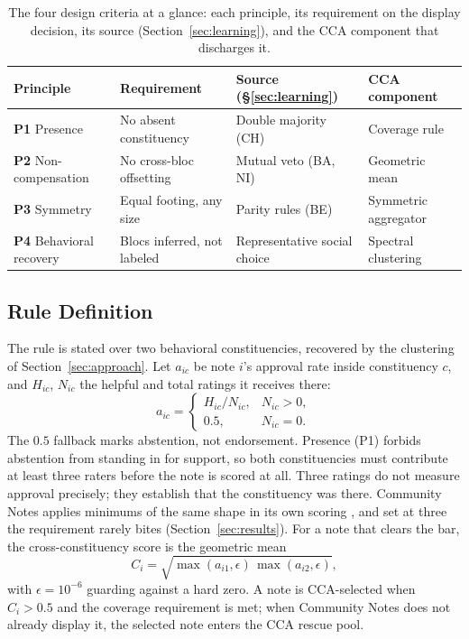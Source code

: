 \documentclass[10pt,twocolumn]{article}
\begin{document}
\begin{table}[t]
  \centering
  \footnotesize
  \setlength{\tabcolsep}{4pt}
  \renewcommand{\arraystretch}{1.25}
  \begin{tabularx}{\columnwidth}{@{}YYYY@{}}
    \toprule
    \textbf{Principle} & \textbf{Requirement} & \textbf{Source (\S\ref{sec:learning})} & \textbf{CCA component} \\
    \midrule
    \textbf{P1} Presence & No absent constituency & Double majority (CH) & Coverage rule \\
    \addlinespace[2pt]
    \textbf{P2} Non-compensation & No cross-bloc offsetting & Mutual veto (BA, NI) & Geometric mean \\
    \addlinespace[2pt]
    \textbf{P3} Symmetry & Equal footing, any size & Parity rules (BE) & Symmetric aggregator \\
    \addlinespace[2pt]
    \textbf{P4} Behavioral recovery & Blocs inferred, not labeled & Representative social choice & Spectral clustering \\
    \bottomrule
  \end{tabularx}
  \caption{The four design criteria at a glance: each principle, its requirement
  on the display decision, its source (Section~\ref{sec:learning}), and the CCA
  component that discharges it.}
  \label{tab:principles-map}
\end{table}

\subsection*{Rule Definition}

The rule is stated over two behavioral constituencies, recovered by the
clustering of Section~\ref{sec:approach}. Let $a_{ic}$ be note $i$'s approval
rate inside constituency $c$, and $H_{ic}$, $N_{ic}$ the helpful and total
ratings it receives there:
\begin{equation}
a_{ic} =
\begin{cases}
H_{ic}/N_{ic}, & N_{ic} > 0,\\
0.5, & N_{ic} = 0.
\end{cases}
\end{equation}
The $0.5$ fallback marks abstention, not endorsement. Presence (P1) forbids
abstention from standing in for support, so both constituencies must contribute
at least three raters before the note is scored at all. Three ratings do not
measure approval precisely; they establish that the constituency was there.
Community Notes applies minimums of the same shape in its own scoring
\citep{xcommunitynotes2026ranking}, and set at three the requirement rarely
bites (Section~\ref{sec:results}). For a note that clears the bar, the
cross-constituency score is the geometric mean
\begin{equation}
    C_i = \sqrt{\max(a_{i1},\epsilon)\,\max(a_{i2},\epsilon)},
    \label{eq:cca-score}
\end{equation}
with $\epsilon = 10^{-6}$ guarding against a hard zero. A note is CCA-selected
when $C_i > 0.5$ and the coverage requirement is met; when Community Notes
does not already display it, the selected note enters the CCA rescue pool.
\end{document}
